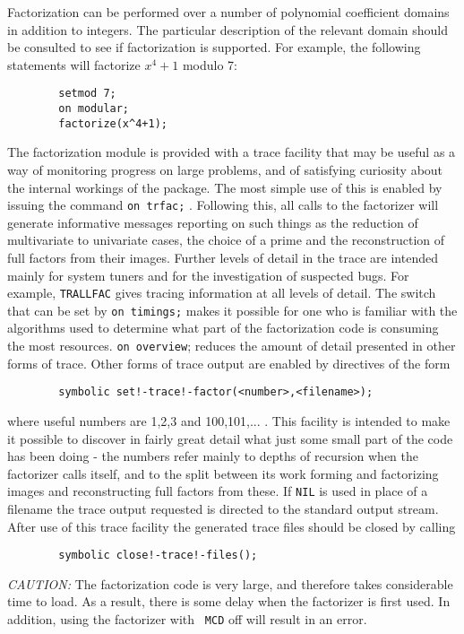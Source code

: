 Factorization can be performed over a number of polynomial coefficient
domains in addition to integers. The particular description of the relevant
domain should be consulted to see if factorization is supported. For
example, the following statements will factorize $x^{4}+1$ modulo 7:
\begin{verbatim}
        setmod 7;
        on modular;
        factorize(x^4+1);
\end{verbatim}
The factorization module is provided with a trace facility that may be useful
as a way of monitoring progress on large problems, and of satisfying
curiosity about the internal workings of the package. The most simple use
of this is enabled by issuing the {\REDUCE} command 
{\tt on trfac;} .
Following this, all calls to the factorizer will generate informative
messages reporting on such things as the reduction of multivariate to
univariate cases, the choice of a prime and the reconstruction of full
factors from their images.  Further levels of detail in the trace are
intended mainly for system tuners and for the investigation of suspected
bugs.  For example, {\tt TRALLFAC} gives tracing information at all levels
of detail.  The switch that can be set by {\tt on timings;} makes it
possible for one who is familiar with the algorithms used to determine
what part of the factorization code is consuming the most resources.
{\tt on overview}; reduces the amount of detail presented in other forms of
trace.  Other forms of trace output are enabled by directives of the form
\begin{verbatim}
        symbolic set!-trace!-factor(<number>,<filename>);
\end{verbatim}
where useful numbers are 1,2,3 and 100,101,... .  This facility is
intended to make it possible to discover in fairly great detail what just
some small part of the code has been doing - the numbers refer mainly to
depths of recursion when the factorizer calls itself, and to the split
between its work forming and factorizing images and reconstructing full
factors from these.  If {\tt NIL} is used in place of a filename the trace
output requested is directed to the standard output stream.  After use of
this trace facility the generated trace files should be closed by calling
\begin{verbatim}
        symbolic close!-trace!-files();
\end{verbatim}
{\it CAUTION:}  The factorization code is very large, and therefore takes
considerable time to load.  As a result, there is some delay when the
factorizer is first used.  In addition, using the factorizer with {\tt
MCD}  off will result in an error.

